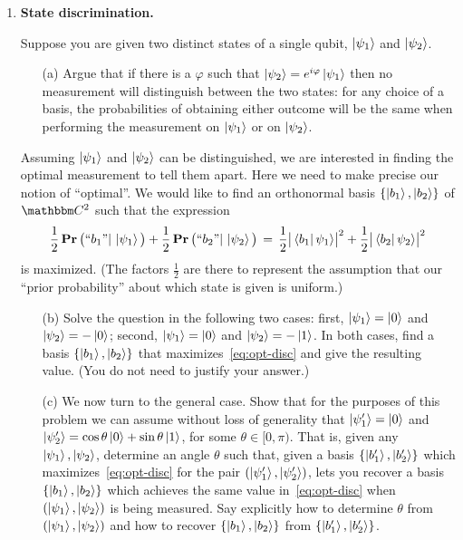 \documentclass[12pt]{article}
\begin{document}
\begin{enumerate}
\item {\bf State discrimination.}

Suppose you are given two distinct states of a single qubit, $\ket{\psi_1}$ and $\ket{\psi_2}$. 
\begin{enumerate}
\item[(a)] Argue that if there is a $\varphi$ such that $\ket{\psi_2} = e^{i\varphi}\ket{\psi_1}$ then no measurement will distinguish between the two states: for any choice of a basis, the probabilities of obtaining either outcome will be the same when performing the measurement on $\ket{\psi_1}$ or on $\ket{\psi_2}$. 
\end{enumerate}
Assuming $\ket{\psi_1}$ and $\ket{\psi_2}$ can be distinguished, we are interested in finding the optimal measurement to tell them apart. Here we need to make precise our notion of ``optimal''. We would like to find an orthonormal basis $\{\ket{b_1},\ket{b_2}\}$ of $\C^2$ such that the expression 
\begin{equation}\label{eq:opt-disc}
\frac{1}{2}\mathop{\bf Pr\/}\big( ``b_1"|\,\ket{\psi_1}\big) + \frac{1}{2}\mathop{\bf Pr\/}\big(``b_2"|\,\ket{\psi_2}\big) \,=\,\frac{1}{2} \big|\bra{b_1}\psi_1\rangle\big|^2 + \frac{1}{2}\big|\bra{b_2}\psi_2\rangle\big|^2
\end{equation}
is maximized. (The factors $\frac{1}{2}$ are there to represent the assumption that our ``prior probability'' about which state is given is uniform.)
\begin{enumerate}[resume]
\item[(b)] Solve the question in the following two cases: first, $\ket{\psi_1}=\ket{0}$ and $\ket{\psi_2}=-\ket{0}$; second, $\ket{\psi_1}=\ket{0}$ and $\ket{\psi_2} = -\ket{1}$. In both cases, find a basis $\{\ket{b_1},\ket{b_2}\}$ that maximizes~\eqref{eq:opt-disc} and give the resulting value. (You do not need to justify your answer.)
\item[(c)] We now turn to the general case. Show that for the purposes of this problem we can assume without loss of generality that $\ket{\psi'_1}=\ket{0}$ and $\ket{\psi'_2} = \cos\theta\ket{0}+\sin\theta\ket{1}$, for some $\theta \in [0,\pi)$. That is, given any $\ket{\psi_1},\ket{\psi_2}$, determine an angle $\theta$ such that, given a basis $\{\ket{b'_1},\ket{b'_2}\}$ which maximizes~\eqref{eq:opt-disc} for the pair $(\ket{\psi'_1},\ket{\psi'_2})$, lets you recover a basis $\{\ket{b_1},\ket{b_2}\}$ which achieves the same value in~\eqref{eq:opt-disc} when $(\ket{\psi_1},\ket{\psi_2})$ is being measured. Say explicitly how to determine $\theta$ from $(\ket{\psi_1},\ket{\psi_2})$ and how to recover $\{\ket{b_1},\ket{b_2}\}$ from $\{\ket{b'_1},\ket{b'_2}\}$.

\end{enumerate}
\end{enumerate}
\end{document}
